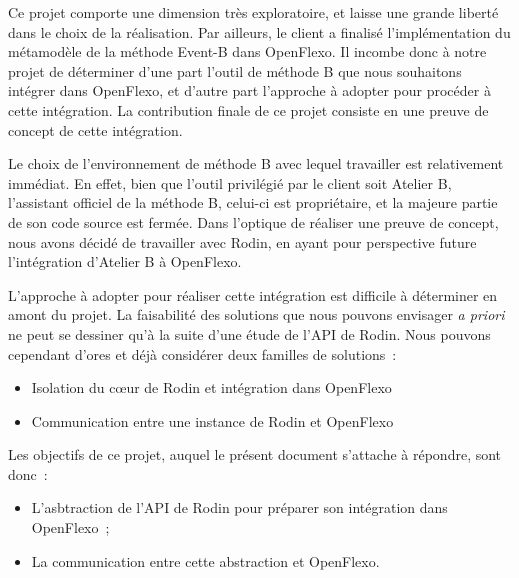 Ce projet comporte une dimension très exploratoire, et laisse une grande liberté dans le choix de la réalisation.
Par ailleurs, le client a finalisé l'implémentation du métamodèle de la méthode Event-B dans OpenFlexo.
Il incombe donc à notre projet de déterminer d'une part l'outil de méthode B que nous souhaitons intégrer dans OpenFlexo, et d'autre part l'approche à adopter pour procéder à cette intégration.
La contribution finale de ce projet consiste en une preuve de concept de cette intégration.

Le choix de l'environnement de méthode B avec lequel travailler est relativement immédiat.
En effet, bien que l'outil privilégié par le client soit Atelier B, l'assistant officiel de la méthode B, celui-ci est propriétaire, et la majeure partie de son code source est fermée.
Dans l'optique de réaliser une preuve de concept, nous avons décidé de travailler avec Rodin, en ayant pour perspective future l'intégration d'Atelier B à OpenFlexo.

L'approche à adopter pour réaliser cette intégration est difficile à déterminer en amont du projet.
La faisabilité des solutions que nous pouvons envisager \textit{a priori} ne peut se dessiner qu'à la suite d'une étude de l'API de Rodin.
Nous pouvons cependant d'ores et déjà considérer deux familles de solutions~:

\begin{itemize}
    \item Isolation du cœur de Rodin et intégration dans OpenFlexo
    \item Communication entre une instance de Rodin et OpenFlexo
\end{itemize}

Les objectifs de ce projet, auquel le présent document s'attache à répondre, sont donc~:

\begin{itemize}
    \item L'asbtraction de l'API de Rodin pour préparer son intégration dans OpenFlexo~;
    \item La communication entre cette abstraction et OpenFlexo.
\end{itemize}
